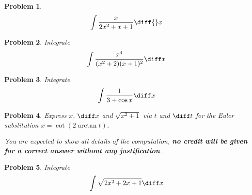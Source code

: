 \documentclass{article}
\newtheorem{problem}{Problem}
\begin{document}
\vskip 10cm

\begin{problem}
\[
\int \frac{x }{2x^2+x+1}\diff{}x
\]

\end{problem}
\newpage

\begin{problem}
Integrate 
\[
\int \frac{x^4}{(x^2+2)(x+1)^2}\diff x
\]
\end{problem}

\newpage
\begin{problem}
Integrate 
\[
\int \frac{1}{3+\cos x}\diff x
\]

\end{problem}

\newpage
\begin{problem}
Express $x$, $\diff x$ and $\sqrt{x^2+1}$ via $t$ and $\diff t$ for the Euler substitution $x=\cot (2\arctan t)$. 

You are expected to show all details of the computation, \textbf{no credit will be given for a correct answer without any justification}.
\end{problem}
\newpage

\begin{problem}
Integrate 
\[
\int \sqrt{2x^2+2x+1}\diff x
\]
\end{problem}
\end{document}
